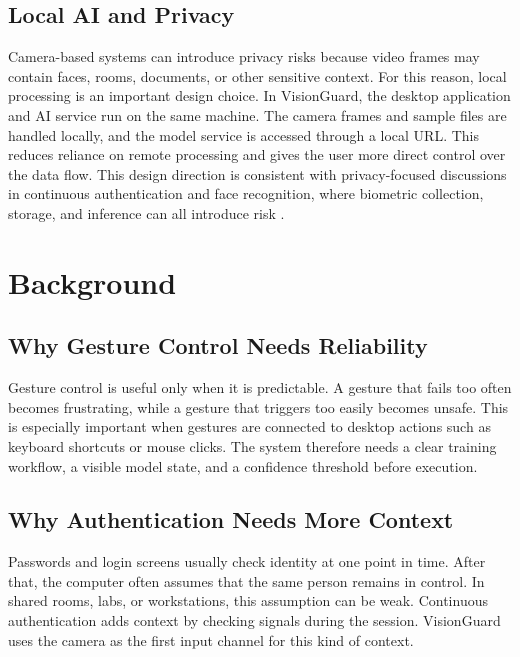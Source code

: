 \documentclass[10pt,twocolumn]{article}
\begin{document}
\subsection{Local AI and Privacy}
Camera-based systems can introduce privacy risks because video frames may contain faces, rooms, documents, or other sensitive context.
For this reason, local processing is an important design choice.
In VisionGuard, the desktop application and AI service run on the same machine.
The camera frames and sample files are handled locally, and the model service is accessed through a local URL.
This reduces reliance on remote processing and gives the user more direct control over the data flow.
This design direction is consistent with privacy-focused discussions in continuous authentication and face recognition, where biometric collection, storage, and inference can all introduce risk \cite{baig2021security,sun2025privacy}.

\section{Background}
\subsection{Why Gesture Control Needs Reliability}
Gesture control is useful only when it is predictable.
A gesture that fails too often becomes frustrating, while a gesture that triggers too easily becomes unsafe.
This is especially important when gestures are connected to desktop actions such as keyboard shortcuts or mouse clicks.
The system therefore needs a clear training workflow, a visible model state, and a confidence threshold before execution.

\subsection{Why Authentication Needs More Context}
Passwords and login screens usually check identity at one point in time.
After that, the computer often assumes that the same person remains in control.
In shared rooms, labs, or workstations, this assumption can be weak.
Continuous authentication adds context by checking signals during the session.
VisionGuard uses the camera as the first input channel for this kind of context.
\end{document}
